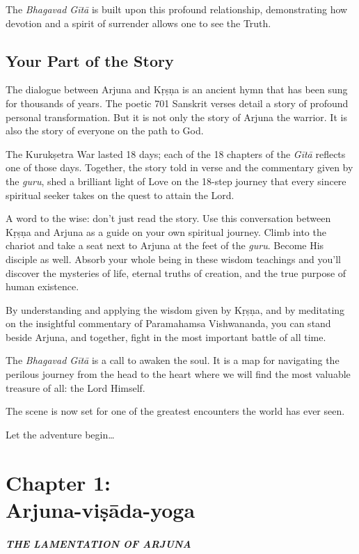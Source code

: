 \documentclass[12pt, twoside, openright]{memoir}
\begin{document}
The \textit{Bhagavad Gītā} is built upon this profound relationship, demonstrating how devotion and a spirit of surrender allows one to see the Truth.

\section{Your Part of the Story}\label{sec-your-part-of-the-story}
The dialogue between Arjuna and Kṛṣṇa is an ancient hymn that has been sung for thousands of years. The poetic 701 Sanskrit verses detail a story of profound personal transformation. But it is not only the story of Arjuna the warrior. It is also the story of everyone on the path to God.

The Kurukṣetra War lasted 18 days; each of the 18 chapters of the \textit{Gītā} reflects one of those days. Together, the story told in verse and the commentary given by the \textit{guru}, shed a brilliant light of Love on the 18-step journey that every sincere spiritual seeker takes on the quest to attain the Lord.

A word to the wise: don’t just read the story. Use this conversation between Kṛṣṇa and Arjuna as a guide on your own spiritual journey. Climb into the chariot and take a seat next to Arjuna at the feet of the \textit{guru}. Become His disciple as well. Absorb your whole being in these wisdom teachings and you’ll discover the mysteries of life, eternal truths of creation, and the true purpose of human existence.

By understanding and applying the wisdom given by Kṛṣṇa, and by meditating on the insightful commentary of Paramahamsa Vishwananda, you can stand beside Arjuna, and together, fight in the most important battle of all time.

The \textit{Bhagavad Gītā} is a call to awaken the soul. It is a map for navigating the perilous journey from the head to the heart where we will find the most valuable treasure of all: the Lord Himself.

The scene is now set for one of the greatest encounters the world has ever seen.

Let the adventure begin\ldots 
\tableofcontents

\chapter{Chapter 1: \\Arjuna-viṣāda-yoga}\label{chap-arjuna-visada-yoga}

\paragraph*{\MakeUppercase{The Lamentation of Arjuna}}
\end{document}
